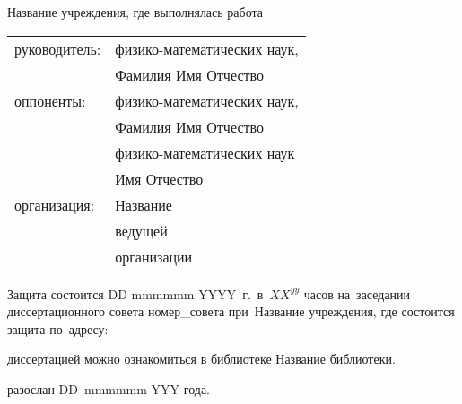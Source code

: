  Название учреждения, где выполнялась работа
\vspace{10mm}
\begin{table} [h]  
  \begin{tabular}{ll}
  \fontsize{14pt}{15pt} руководитель: & \fontsize{14pt}{15pt} физико-математических наук,                     \\
                        & \fontsize{14pt}{15pt} Фамилия Имя Отчество
\vspace{3mm} \\
  \fontsize{14pt}{15pt} оппоненты:& \fontsize{14pt}{15pt} физико-математических наук,                     \\
                        & \fontsize{14pt}{15pt} Фамилия Имя Отчество \vspace{1mm}         \\
                        & \fontsize{14pt}{15pt} физико-математических наук                    \\
                        & \fontsize{14pt}{15pt} Имя Отчество \vspace{3mm}                \\
  \fontsize{14pt}{15pt} организация:  & \fontsize{14pt}{15pt}\selectfont Название                \\
                        & \fontsize{14pt}{15pt}\selectfont ведущей                     \\
                        & \fontsize{14pt}{15pt}\selectfont организации
  \end{tabular}  
\end{table}

\vspace{20mm}
\noindent Защита состоится DD mmmmmm YYYY~г.~в~$XX^{yy}$ часов на~заседании диссертационного совета \mbox{номер_совета} при~Название учреждения, где состоится защита по~адресу: 

\vspace{15mm}
 диссертацией можно ознакомиться в библиотеке Название библиотеки.

\vspace{15mm}
 разослан DD~mmmmmm YYY года.

